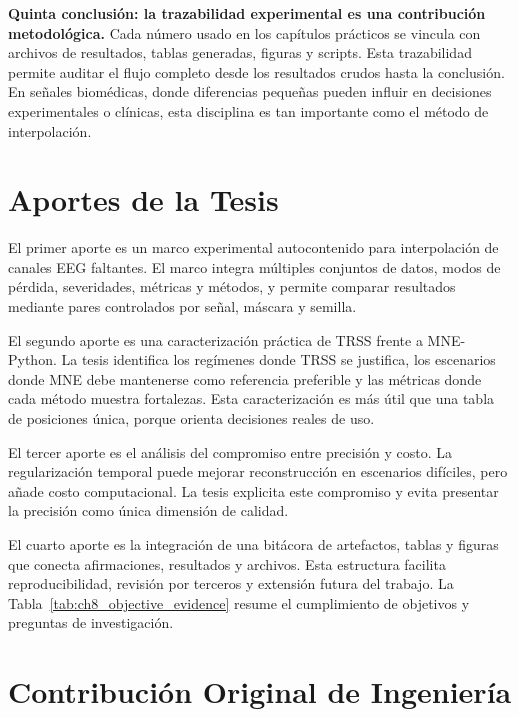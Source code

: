 \textbf{Quinta conclusión: la trazabilidad experimental es una contribución metodológica.} Cada número usado en los capítulos prácticos se vincula con archivos de resultados, tablas generadas, figuras y scripts. Esta trazabilidad permite auditar el flujo completo desde los resultados crudos hasta la conclusión. En señales biomédicas, donde diferencias pequeñas pueden influir en decisiones experimentales o clínicas, esta disciplina es tan importante como el método de interpolación.

\section{Aportes de la Tesis}

El primer aporte es un marco experimental autocontenido para interpolación de canales EEG faltantes. El marco integra múltiples conjuntos de datos, modos de pérdida, severidades, métricas y métodos, y permite comparar resultados mediante pares controlados por señal, máscara y semilla.

El segundo aporte es una caracterización práctica de TRSS frente a MNE-Python. La tesis identifica los regímenes donde TRSS se justifica, los escenarios donde MNE debe mantenerse como referencia preferible y las métricas donde cada método muestra fortalezas. Esta caracterización es más útil que una tabla de posiciones única, porque orienta decisiones reales de uso.

El tercer aporte es el análisis del compromiso entre precisión y costo. La regularización temporal puede mejorar reconstrucción en escenarios difíciles, pero añade costo computacional. La tesis explicita este compromiso y evita presentar la precisión como única dimensión de calidad.

El cuarto aporte es la integración de una bitácora de artefactos, tablas y figuras que conecta afirmaciones, resultados y archivos. Esta estructura facilita reproducibilidad, revisión por terceros y extensión futura del trabajo. La Tabla~\ref{tab:ch8_objective_evidence} resume el cumplimiento de objetivos y preguntas de investigación.



\section{Contribución Original de Ingeniería}

